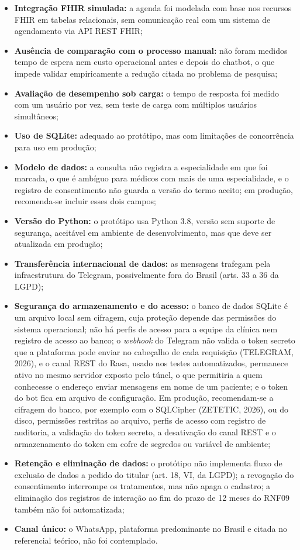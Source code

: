 \documentclass[12pt,a4paper]{extarticle}
\begin{document}
\begin{itemize}
    \item \textbf{Integração FHIR simulada:} a agenda foi modelada com base nos recursos FHIR em tabelas relacionais, sem comunicação real com um sistema de agendamento via API REST FHIR;
    \item \textbf{Ausência de comparação com o processo manual:} não foram medidos tempo de espera nem custo operacional antes e depois do chatbot, o que impede validar empiricamente a redução citada no problema de pesquisa;
    \item \textbf{Avaliação de desempenho sob carga:} o tempo de resposta foi medido com um usuário por vez, sem teste de carga com múltiplos usuários simultâneos;
    \item \textbf{Uso de SQLite:} adequado ao protótipo, mas com limitações de concorrência para uso em produção;
    \item \textbf{Modelo de dados:} a consulta não registra a especialidade em que foi marcada, o que é ambíguo para médicos com mais de uma especialidade, e o registro de consentimento não guarda a versão do termo aceito; em produção, recomenda-se incluir esses dois campos;
    \item \textbf{Versão do Python:} o protótipo usa Python 3.8, versão sem suporte de segurança, aceitável em ambiente de desenvolvimento, mas que deve ser atualizada em produção;
    \item \textbf{Transferência internacional de dados:} as mensagens trafegam pela infraestrutura do Telegram, possivelmente fora do Brasil (arts. 33 a 36 da LGPD);
    \item \textbf{Segurança do armazenamento e do acesso:} o banco de dados SQLite é um arquivo local sem cifragem, cuja proteção depende das permissões do sistema operacional; não há perfis de acesso para a equipe da clínica nem registro de acesso ao banco; o \textit{webhook} do Telegram não valida o token secreto que a plataforma pode enviar no cabeçalho de cada requisição (TELEGRAM, 2026), e o canal REST do Rasa, usado nos testes automatizados, permanece ativo no mesmo servidor exposto pelo túnel, o que permitiria a quem conhecesse o endereço enviar mensagens em nome de um paciente; e o token do bot fica em arquivo de configuração. Em produção, recomendam-se a cifragem do banco, por exemplo com o SQLCipher (ZETETIC, 2026), ou do disco, permissões restritas ao arquivo, perfis de acesso com registro de auditoria, a validação do token secreto, a desativação do canal REST e o armazenamento do token em cofre de segredos ou variável de ambiente;
    \item \textbf{Retenção e eliminação de dados:} o protótipo não implementa fluxo de exclusão de dados a pedido do titular (art. 18, VI, da LGPD); a revogação do consentimento interrompe os tratamentos, mas não apaga o cadastro; a eliminação dos registros de interação ao fim do prazo de 12 meses do RNF09 também não foi automatizada;
    \item \textbf{Canal único:} o WhatsApp, plataforma predominante no Brasil e citada no referencial teórico, não foi contemplado.
\end{itemize}
\end{document}

